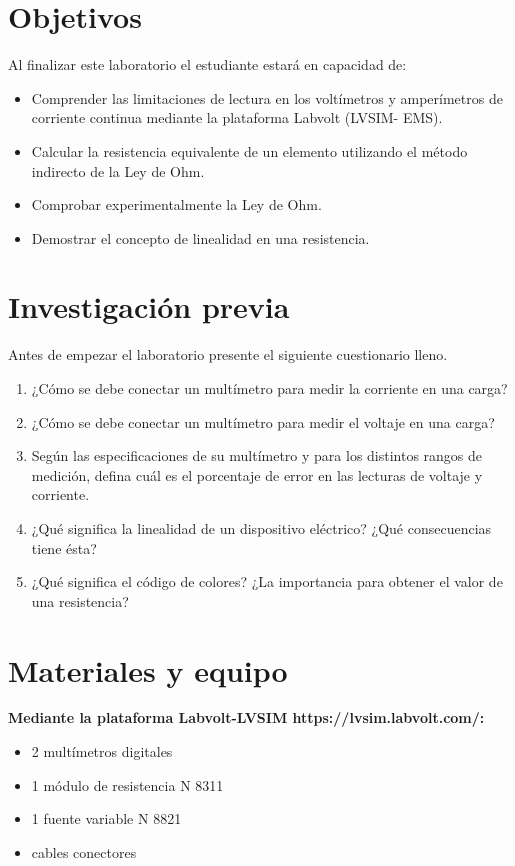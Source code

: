 \documentclass[12pt,letterpaper]{report}
\newcommand{\obj}{Objetivos}
\newcommand{\inv}{Investigación previa}
\newcommand{\mat}{Materiales y equipo}
\newcommand{\capacidad}{Al finalizar este laboratorio el estudiante estará en capacidad de:}
\newcommand{\antesde}{Antes de empezar el laboratorio presente el siguiente cuestionario lleno.}
\begin{document}
\section{\obj}
\capacidad
\begin{itemize}
\item Comprender las limitaciones de lectura en los voltímetros y amperímetros de corriente continua mediante la plataforma Labvolt (LVSIM- EMS).
\item Calcular la resistencia equivalente de un elemento utilizando el método indirecto de la Ley de Ohm.
\item	Comprobar experimentalmente la Ley de Ohm.
\item	Demostrar el concepto de linealidad en una resistencia.
\end{itemize}

\section{\inv}
\antesde
\begin{enumerate}
\item	¿Cómo se debe conectar un multímetro para medir la corriente en una carga? 
\item	¿Cómo se debe conectar un multímetro para medir el voltaje en una carga?
\item	Según las especificaciones de su multímetro y para los distintos rangos de medición, defina cuál es el porcentaje de error en las lecturas de voltaje y corriente.
\item	¿Qué significa la linealidad de un dispositivo eléctrico? ¿Qué consecuencias tiene ésta?
\item ¿Qué significa el código de colores? ¿La importancia para obtener el valor de una resistencia?

\end{enumerate}

\section{\mat}
\textbf{Mediante la plataforma Labvolt-LVSIM https://lvsim.labvolt.com/:}
\begin{itemize}
\item 2 multímetros digitales
\item 1 módulo de resistencia N 8311
\item 1 fuente variable N 8821
\item cables conectores
\end{itemize}
\end{document}
